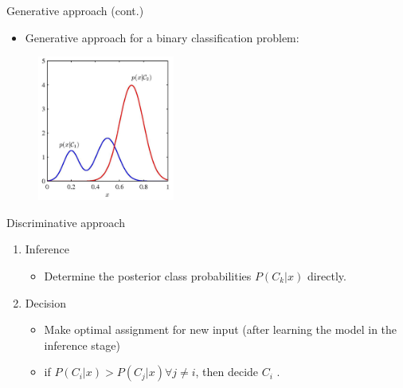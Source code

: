 \documentclass[serif, aspectratio=169]{beamer}
\begin{document}
\begin{frame}{Generative approach (cont.)}

    \begin{itemize}
        \item Generative approach for a binary classification problem:
    \end{itemize}
    \begin{figure}[h]
      \centering
      \includegraphics[width=0.4\textwidth]{pic/Generative.png}
      \end{figure}
    \vfill
\end{frame}
\begin{frame}{Discriminative approach}
    \begin{enumerate}
        \item Inference
        \begin{itemize}
            \item Determine the posterior class probabilities $P(C_k|x)$ directly.
        \end{itemize}
        \item Decision
        \begin{itemize}
            \item Make optimal assignment for new input (after learning the model in the inference stage)
            \item if $P(C_i|x) > P(C_j|x) \forall j \neq i$, then decide $C_i$ .
        \end{itemize}
    \end{enumerate}
\end{frame}
\end{document}
